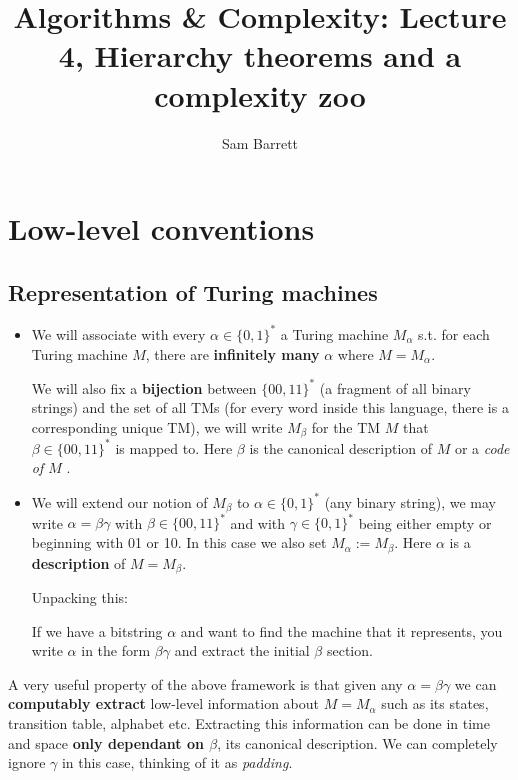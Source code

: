 \documentclass{article}
\title{Algorithms \& Complexity: Lecture 4, Hierarchy theorems and a complexity zoo}
\author{Sam Barrett}
\begin{document}
\maketitle

\section{Low-level conventions}
\label{sec:conventions}

\subsection{Representation of Turing machines}
\label{subsec:representingTMs}
\begin{itemize}
  \item We will associate with every $\alpha\in \{ 0,1 \} ^{*}$ a Turing machine $M_{\alpha}$ s.t. for each Turing machine $M$, there are \textbf{infinitely many} $\alpha$ where $M = M_{\alpha}$.

        We will also fix a \textbf{bijection} between $\{ 00,11 \} ^{*}$ (a fragment of all binary strings) and the set of all TMs (for every word inside this language, there is a corresponding unique TM), we will write $M_{\beta}$ for the TM $M$ that $\beta \in \{ 00,11 \} ^{*}$ is mapped to. Here $\beta$ is the canonical description of $M$ or a \textit{code of $M$} .

  \item We will extend our notion of $M_{\beta}$ to $\alpha \in \{ 0,1 \} ^{*}$ (any binary string), we may write $\alpha = \beta\gamma$ with $\beta \in \{ 00,11 \} ^{*}$ and with $\gamma \in \{ 0,1 \} ^{*}$ being either empty or beginning with 01 or 10. In this case we also set $M_{\alpha} := M_{\beta}$. Here $\alpha$ is a \textbf{description} of $M = M_{\beta}$.

        Unpacking this:

        If we have a bitstring \(\alpha\) and want to find the machine that it represents, you write \(\alpha\) in the form \(\beta\gamma\) and extract the initial \(\beta\) section.
\end{itemize}

A very useful property of the above framework is that given any \(\alpha = \beta\gamma\) we can \textbf{computably extract} low-level information about $M = M_{\alpha}$ such as its states, transition table, alphabet etc. Extracting this information can be done in time and space \textbf{only dependant on \(\beta\)}, its canonical description. We can completely ignore \(\gamma\) in this case, thinking of it as \textit{padding}.
\end{document}
